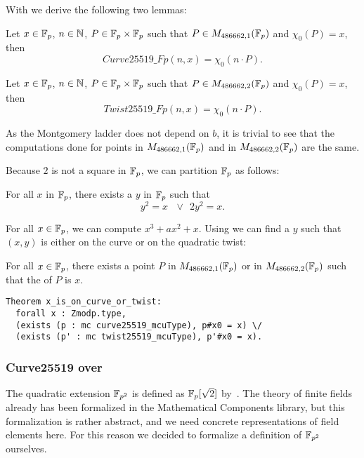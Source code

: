 With  we derive the following two lemmas:
\begin{lemma}
  Let $x \in \mathbb{F}_{p}$, $n \in \mathbb{N}$, $P \in \mathbb{F}_{p} \times \mathbb{F}_{p}$
  such that $P \in M_{486662,1}(\mathbb{F}_{p})$ and $\chi_0(P) = x$, then
  $$Curve25519\_Fp(n,x) = \chi_0(n \cdot P).$$
\end{lemma}
\begin{lemma}
  Let $x \in \mathbb{F}_{p}$, $n \in \mathbb{N}$, $P \in \mathbb{F}_{p} \times \mathbb{F}_{p}$
  such that $P \in M_{486662,2}(\mathbb{F}_{p})$ and $\chi_0(P) = x$, then
  $$Twist25519\_Fp(n,x) = \chi_0(n \cdot P).$$
\end{lemma}
As the Montgomery ladder does not depend on $b$, it is trivial to
see that the computations done for points in $M_{486662,1}(\mathbb{F}_{p})$ and in
$M_{486662,2}(\mathbb{F}_{p})$ are the same.

Because $2$ is not a square in $\mathbb{F}_{p}$, we can partition $\mathbb{F}_{p}$ as follows:
\begin{lemma}
  \label{lemma:square-or-2square}
  For all $x$ in $\mathbb{F}_{p}$, there exists a $y$ in $\mathbb{F}_{p}$ such that
  $$y^2 = x\ \ \ \lor\ \ 2y^2 = x.$$
\end{lemma}
For all $x \in \mathbb{F}_{p}$, we can compute $x^3 + ax^2 + x$. Using 
we can find a $y$ such that $(x,y)$ is either on the curve or on the quadratic twist:
\begin{lemma}
  \label{lemma:curve-or-twist}
  For all $x \in \mathbb{F}_{p}$, there exists a point $P$ in $M_{486662,1}(\mathbb{F}_{p})$ or
  in $M_{486662,2}(\mathbb{F}_{p})$ such that the \xcoord of $P$ is $x$.
\end{lemma}
\begin{lstlisting}[language=Coq,belowskip=-0.5 \baselineskip]
Theorem x_is_on_curve_or_twist:
  forall x : Zmodp.type,
  (exists (p : mc curve25519_mcuType), p#x0 = x) \/
  (exists (p' : mc twist25519_mcuType), p'#x0 = x).
\end{lstlisting}

\subsubsection{Curve25519 over }
\label{subsec:curvep2}

The quadratic extension $\mathbb{F}_{p^2}$ is defined as $\mathbb{F}_{p}[\sqrt{2}]$ by~\cite{Ber06}.
The theory of finite fields already has been formalized in the Mathematical Components
library,
but this formalization is rather abstract, and we need concrete representations of field
elements here.
For this reason we decided to formalize a definition of $\mathbb{F}_{p^2}$ ourselves.

